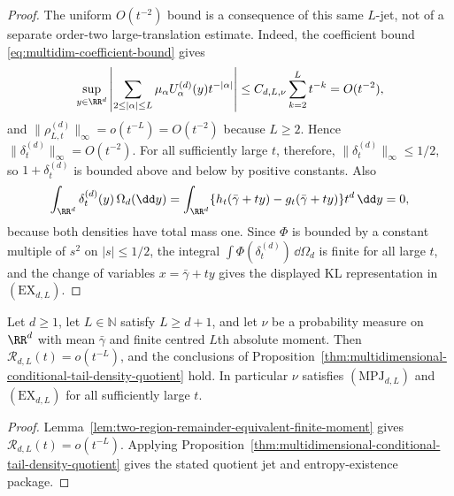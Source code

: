 \begin{proof}
The uniform \(O(t^{-2})\) bound is a consequence of this same \(L\)-jet, not
of a separate order-two large-translation estimate.  Indeed, the coefficient
bound \eqref{eq:multidim-coefficient-bound} gives
\[
\sup_{y\in\RR^d}
\left|\sum_{2\le|\alpha|\le L}
\mu_\alpha U_\alpha^{(d)}(y)t^{-|\alpha|}\right|
\le C_{d,L,\nu}\sum_{k=2}^{L}t^{-k}
=O(t^{-2}),
\]
and \(\|\rho_{L,t}^{(d)}\|_\infty=o(t^{-L})=O(t^{-2})\) because \(L\ge2\).
Hence
\(\|\delta_t^{(d)}\|_\infty=O(t^{-2})\).
For all sufficiently large \(t\), therefore, \(\|\delta_t^{(d)}\|_\infty\le
1/2\), so \(1+\delta_t^{(d)}\) is bounded above and below by positive
constants.  Also
\[
\int_{\RR^d}\delta_t^{(d)}(y)\,\Omega_d(\dd y)
=\int_{\RR^d}\{h_t(\bar{\gamma}+ty)-g_t(\bar{\gamma}+ty)\}t^d\,\dd y=0,
\]
because both densities have total mass one.  Since \(\Phi\) is bounded by a
constant multiple of \(s^2\) on \(|s|\le1/2\), the integral
\(\int\Phi(\delta_t^{(d)})\,\dd\Omega_d\) is finite for all large \(t\), and
the change of variables \(x=\bar{\gamma}+ty\) gives the displayed KL
representation in \((\mathrm{EX}_{d,L})\).
\end{proof}

\begin{theorem}%
\label{thm:multidimensional-density-quotient}
Let \(d\ge1\), let \(L\in\mathbb N\) satisfy \(L\ge d+1\), and let \(\nu\) be
a probability measure on \(\RR^d\) with mean \(\bar{\gamma}\) and finite
centred \(L\)th absolute moment.  Then
\(\mathcal R_{d,L}(t)=o(t^{-L})\), and the conclusions of
Proposition~\ref{thm:multidimensional-conditional-tail-density-quotient}
hold.
In particular \(\nu\) satisfies \((\mathrm{MPJ}_{d,L})\) and
\((\mathrm{EX}_{d,L})\) for all sufficiently large \(t\).
\end{theorem}

\begin{proof}
Lemma~\ref{lem:two-region-remainder-equivalent-finite-moment} gives
\(\mathcal R_{d,L}(t)=o(t^{-L})\).  Applying
Proposition~\ref{thm:multidimensional-conditional-tail-density-quotient} gives
the stated quotient jet and entropy-existence package.
\end{proof}

